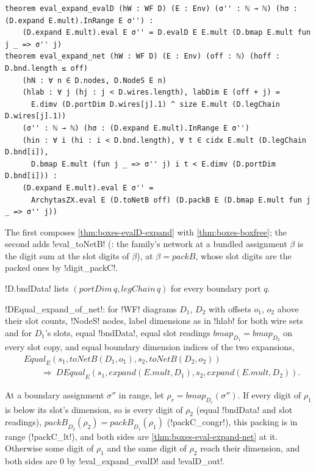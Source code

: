 {\begin{theorem}\label{thm:boxes-eval-expand-net}
\begin{lstlisting}[style=leanbox]
theorem eval_expand_evalD (hW : WF D) (E : Env) (σ'' : ℕ → ℕ) (hσ : (D.expand E.mult).InRange E σ'') :
    (D.expand E.mult).eval E σ'' = D.evalD E E.mult (D.bmap E.mult fun j _ => σ'' j)
theorem eval_expand_net (hW : WF D) (E : Env) (off : ℕ) (hoff : D.bnd.length ≤ off)
    (hN : ∀ n ∈ D.nodes, D.NodeS E n)
    (hlab : ∀ j (hj : j < D.wires.length), labDim E (off + j) =
      E.dimv (D.portDim D.wires[j].1) ^ size E.mult (D.legChain D.wires[j].1))
    (σ'' : ℕ → ℕ) (hσ : (D.expand E.mult).InRange E σ'')
    (hin : ∀ i (hi : i < D.bnd.length), ∀ t ∈ cidx E.mult (D.legChain D.bnd[i]),
      D.bmap E.mult (fun j _ => σ'' j) i t < E.dimv (D.portDim D.bnd[i])) :
    (D.expand E.mult).eval E σ'' =
      ArchytasZX.eval E (D.toNetB off) (D.packB E (D.bmap E.mult fun j _ => σ'' j))
\end{lstlisting}
\end{theorem}
\noindent The first composes \cref{thm:boxes-evalD-expand} with \cref{thm:boxes-boxfree}; the second adds \lbx!eval_toNetB! (: the family's network at a bundled assignment $\beta$ is the digit sum at the slot digits of $\beta$), at $\beta=\mathit{packB}$, whose slot digits are the packed ones by \lbx!digit_packC!.

\lbx!D.bndData! lists $(\mathit{portDim}\,q,\mathit{legChain}\,q)$ for every boundary port $q$.

\begin{theorem}\label{thm:boxes-DEqual-expand-net}
\lbx!DEqual_expand_of_net!: for \lbx!WF! diagrams $D_1$, $D_2$ with offsets $o_1$, $o_2$ above their slot counts, \lbx!NodeS! nodes, label dimensions as in \lbx!hlab! for both wire sets and for $D_1$'s slots, equal \lbx!bndData!, equal slot readings $\mathit{bmap}_{D_1}=\mathit{bmap}_{D_2}$ on every slot copy, and equal boundary dimension indices of the two expansions,
\begin{align*}
&\mathit{Equal}_E(s_1,\mathit{toNetB}(D_1,o_1),s_2,\mathit{toNetB}(D_2,o_2))\\
&\qquad\Rightarrow\ \mathit{DEqual}_E(s_1,\mathit{expand}(E.\mathit{mult},D_1),s_2,\mathit{expand}(E.\mathit{mult},D_2)).
\end{align*}
\end{theorem}
\noindent At a boundary assignment $\sigma''$ in range, let $\rho_r=\mathit{bmap}_{D_r}(\sigma'')$. If every digit of $\rho_1$ is below its slot's dimension, so is every digit of $\rho_2$ (equal \lbx!bndData! and slot readings), $\mathit{packB}_{D_2}(\rho_2)=\mathit{packB}_{D_1}(\rho_1)$ (\lbx!packC_congr!), this packing is in range (\lbx!packC_lt!), and both sides are \cref{thm:boxes-eval-expand-net} at it. Otherwise some digit of $\rho_1$ and the same digit of $\rho_2$ reach their dimension, and both sides are $0$ by \lbx!eval_expand_evalD! and \lbx!evalD_out!.

}
